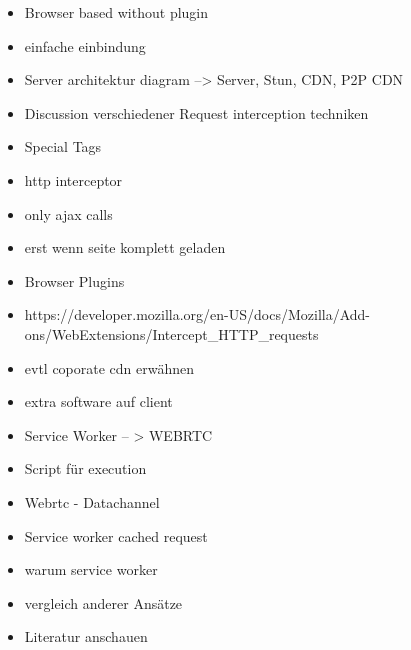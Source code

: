 \begin{itemize}
	\item Browser based without plugin
	\item einfache einbindung
	\item Server architektur diagram --> Server, Stun, CDN, P2P CDN
	\item Discussion verschiedener Request interception techniken
	\item Special Tags
	\item http interceptor
	\item 	only ajax calls
	\item 	erst wenn seite komplett geladen
	\item Browser Plugins
	\item 	https://developer.mozilla.org/en-US/docs/Mozilla/Add-ons/WebExtensions/Intercept_HTTP_requests
	\item evtl coporate cdn erwähnen
	\item extra software auf client
	\item Service Worker -- > WEBRTC
	\item Script für execution
	\item Webrtc - Datachannel
	\item Service worker cached request
	\item warum service worker
	\item 	vergleich anderer Ansätze
	\item 	Literatur anschauen
\end{itemize}
%
%
